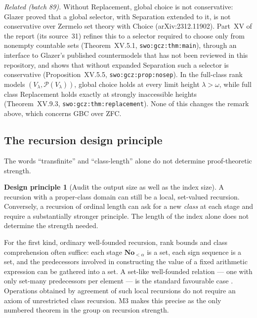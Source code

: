 \documentclass[11pt,letterpaper]{article}
\numberwithin{equation}{section}
\theoremstyle{definition}
\newtheorem{principle}[theorem]{Design principle}
\theoremstyle{remark}
\newcommand{\No}{\mathbf{No}}
\begin{document}
\emph{Related (batch 89).} Without Replacement, global choice is not
conservative: Glazer proved that a global selector, with Separation extended to
it, is not conservative over Zermelo set theory with Choice (arXiv:2312.11902).
Part~XV of the report
(its source~31) refines this to a selector required to choose only from
nonempty countable sets (Theorem~XV.5.1, \texttt{swo:gcz:thm:main}), through an
interface to Glazer's published countermodels that has not been reviewed in
this repository, and shows that without expanded Separation such a selector is
conservative (Proposition~XV.5.5, \texttt{swo:gcz:prop:nosep}). In the
full-class rank models $(V_\lambda,\mathcal P(V_\lambda))$, global choice holds
at every limit height $\lambda>\omega$, while full class Replacement holds
exactly at strongly inaccessible heights (Theorem~XV.9.3,
\texttt{swo:gcz:thm:replacement}). None of this changes the remark above, which
concerns GBC over ZFC.

\subsection{The recursion design principle}
\label{found:sub:recursionprinciple}
The words ``transfinite'' and ``class-length'' alone do not determine
proof-theoretic strength.

\begin{principle}[Audit the output size as well as the index size]\label{found:prin:recursion}
A recursion with a proper-class domain can still be a local, set-valued
recursion. Conversely, a recursion of ordinal length can ask for a new
\emph{class} at each stage and require a substantially stronger principle. The
length of the index alone does not determine the strength needed.
\end{principle}

For the first kind, ordinary well-founded recursion, rank bounds and class
comprehension often suffice: each stage $\No_{<\alpha}$ is a set, each sign
sequence is a set, and the predecessors involved in constructing the value of a
fixed arithmetic expression can be gathered into a set. A set-like well-founded
relation --- one with only set-many predecessors per element --- is the standard
favourable case \cite{found:HamkinsRecursion}. Operations obtained by agreement
of such local recursions do not require an axiom of unrestricted class
recursion. M3 makes this precise as the only numbered theorem in the group on
recursion strength.
\end{document}
